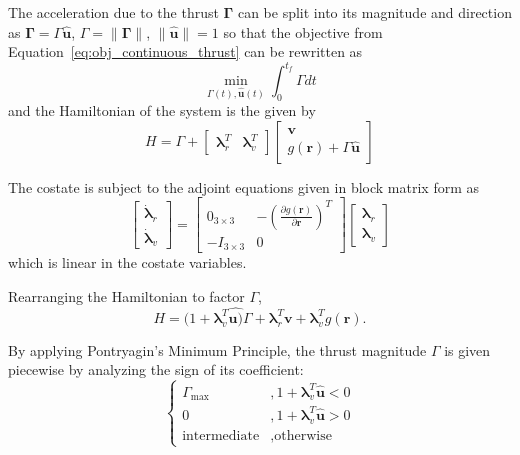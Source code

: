 The acceleration due to the thrust \(\mathbf{\Gamma} \) can be split into its magnitude and direction as \(\mathbf{\Gamma} = \Gamma \hat{\mathbf{u}}\), \(\Gamma = \lVert \mathbf{\Gamma} \rVert\), \(\lVert \hat{\mathbf{u}} \rVert = 1\) so that the objective from Equation~\eqref{eq:obj_continuous_thrust} can be rewritten as
\begin{equation}
    \min_{\Gamma(t), \hat{\mathbf{u}}(t)} \int_0^{t_f} \Gamma dt
\end{equation}
and the Hamiltonian of the system is the given by
\begin{equation}
    H = \Gamma + \begin{bmatrix}
        \mathbf{\lambda}_r^T & \mathbf{\lambda}_v^T
    \end{bmatrix} \begin{bmatrix}
        \mathbf{v} \\ g(\mathbf{r}) + \Gamma \hat{\mathbf{u}}
    \end{bmatrix}
\end{equation}

The costate is subject to the adjoint equations given in block matrix form as
\begin{equation}
    \begin{bmatrix}
        \dot{\mathbf{\lambda}}_r \\ \dot{\mathbf{\lambda}}_v
    \end{bmatrix} = \begin{bmatrix}
        0_{3\times3} & -\left(\frac{\partial g(\mathbf{r})}{\partial \mathbf{r}}\right)^T \\
        -I_{3\times3} & 0
    \end{bmatrix} \begin{bmatrix}
        \mathbf{\lambda}_r \\ \mathbf{\lambda}_v
    \end{bmatrix}
\end{equation}
which is linear in the costate variables. 

Rearranging the Hamiltonian to factor \(\Gamma \), 
\begin{equation}
    H = (1 + \mathbf{\lambda}_v^T \hat{\mathbf{u})} \Gamma + \mathbf{\lambda}_r^T \mathbf{v} + \mathbf{\lambda}_v^T g(\mathbf{r}).
\end{equation}

By applying Pontryagin's Minimum Principle, the thrust magnitude \(\Gamma\) is given piecewise by analyzing the sign of its coefficient:
\begin{equation}
    \begin{cases}
        \Gamma_{\max}&, 1+\mathbf{\lambda}_v^T \hat{\mathbf{u}} < 0 \\
        0&, 1 + \mathbf{\lambda}_v^T \hat{\mathbf{u}} > 0 \\
        \text{intermediate}&, \text{otherwise}
    \end{cases}
\end{equation}

